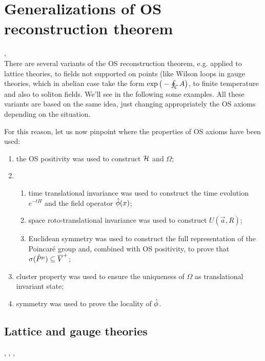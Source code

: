 \documentclass[../main/main.tex]{subfiles}
\begin{document}
\section{Generalizations of OS reconstruction theorem}

\cite{Summers:2016}, \cite[Section 6.1]{Glimm:1987}\\

There are several variants of the OS reconstruction theorem, e.g. applied to lattice theories, to fields not supported on points (like Wilson loops in gauge theories, which in abelian case take the form $\exp\big(-\oint_\mathcal C A\big)$, to finite temperature and also to soliton fields. We'll see in the following some examples. 
All these variants are based on the same idea, just changing appropriately the OS axioms depending on the situation. 

For this reason, let us now pinpoint where the properties of OS axioms have been used:
\begin{enumerate}[label=(\arabic*)]
	\item the OS positivity was used to construct $\mathcal H$ and $\Omega$;
	\item \begin{enumerate}[label=(\roman*)]
			\item time translational invariance was used to construct the time evolution $e^{-tH}$ and the field operator $\hat{\phi}(x)$;
			\item space roto-translational invariance was used to construct $U(\vec a,R)$;
			\item Euclidean symmetry was used to construct the full representation of the Poincaré group and, combined with OS positivity, to prove that $\sigma(\hat{P}^\mu)\subseteq \overline V^+$;
		\end{enumerate}
	\item cluster property was used to ensure the uniqueness of $\Omega$ as translational invariant state;
	\item symmetry was used to prove the locality of $\hat{\phi}$.
\end{enumerate}

\subsection{Lattice and gauge theories}

\cite[Section 4]{Frohlich:1980aa}, \cite{Osterwalder:1977pc}, \cite{Seiler:1982}, \cite[Section 6.4]{Strocchi:1993}\\
\end{document}
